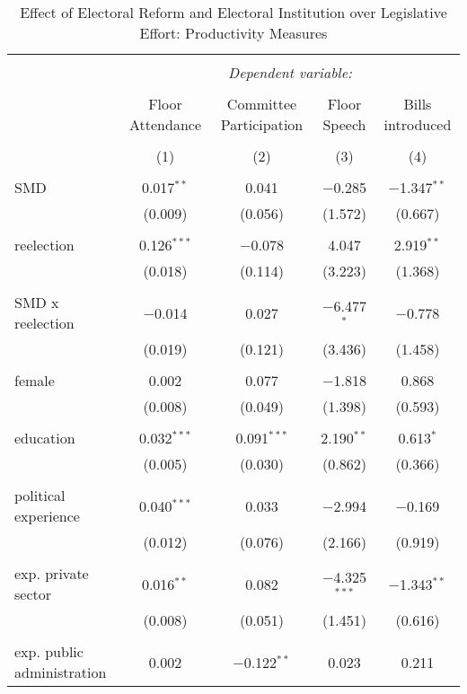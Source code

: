 \documentclass{article}
\begin{document}
\begin{table}[!htbp] \centering 
  \caption{Effect of Electoral Reform and Electoral Institution over Legislative Effort: Productivity Measures} 
  \label{} 
\begin{tabular}{@{\extracolsep{5pt}}lcccc} 
\\[-1.8ex]\hline 
\hline \\[-1.8ex] 
 & \multicolumn{4}{c}{\textit{Dependent variable:}} \\ 
\cline{2-5} 
\\[-1.8ex] & Floor Attendance & Committee Participation & Floor Speech & Bills introduced \\ 
\\[-1.8ex] & (1) & (2) & (3) & (4)\\ 
\hline \\[-1.8ex] 
 SMD & 0.017$^{**}$ & 0.041 & $-$0.285 & $-$1.347$^{**}$ \\ 
  & (0.009) & (0.056) & (1.572) & (0.667) \\ 
  & & & & \\ 
 reelection & 0.126$^{***}$ & $-$0.078 & 4.047 & 2.919$^{**}$ \\ 
  & (0.018) & (0.114) & (3.223) & (1.368) \\ 
  & & & & \\ 
   SMD x reelection & $-$0.014 & 0.027 & $-$6.477$^{*}$ & $-$0.778 \\ 
  & (0.019) & (0.121) & (3.436) & (1.458) \\ 
  & & & & \\ 
 female & 0.002 & 0.077 & $-$1.818 & 0.868 \\ 
  & (0.008) & (0.049) & (1.398) & (0.593) \\ 
  & & & & \\ 
 education & 0.032$^{***}$ & 0.091$^{***}$ & 2.190$^{**}$ & 0.613$^{*}$ \\ 
  & (0.005) & (0.030) & (0.862) & (0.366) \\ 
  & & & & \\ 
 political experience & 0.040$^{***}$ & 0.033 & $-$2.994 & $-$0.169 \\ 
  & (0.012) & (0.076) & (2.166) & (0.919) \\ 
  & & & & \\ 
 exp. private sector & 0.016$^{**}$ & 0.082 & $-$4.325$^{***}$ & $-$1.343$^{**}$ \\ 
  & (0.008) & (0.051) & (1.451) & (0.616) \\ 
  & & & & \\ 
 exp. public administration & 0.002 & $-$0.122$^{**}$ & 0.023 & 0.211 \\ 

\end{tabular}
\end{table}
\end{document}
